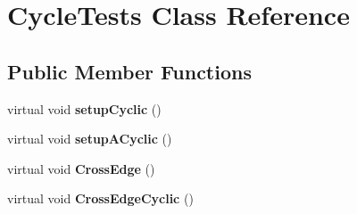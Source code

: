 \hypertarget{classCycleTests}{\section{\-Cycle\-Tests \-Class \-Reference}
\label{classCycleTests}
}
\subsection*{\-Public \-Member \-Functions}
\begin{DoxyCompactItemize}
\item 
\hypertarget{classCycleTests_af2c7fd46d25ffd29907ca4bc7f328234}{virtual void {\bfseries setup\-Cyclic} ()}\label{classCycleTests_af2c7fd46d25ffd29907ca4bc7f328234}

\item 
\hypertarget{classCycleTests_a026573ee042490e8042f2281fa5d74cf}{virtual void {\bfseries setup\-A\-Cyclic} ()}\label{classCycleTests_a026573ee042490e8042f2281fa5d74cf}

\item 
\hypertarget{classCycleTests_ad3bc01f5c297f141b75c50e87ecbfe6a}{virtual void {\bfseries \-Cross\-Edge} ()}\label{classCycleTests_ad3bc01f5c297f141b75c50e87ecbfe6a}

\item 
\hypertarget{classCycleTests_abde4943e654f19fd7e65d2ed70e681e4}{virtual void {\bfseries \-Cross\-Edge\-Cyclic} ()}\label{classCycleTests_abde4943e654f19fd7e65d2ed70e681e4}

\end{DoxyCompactItemize}
